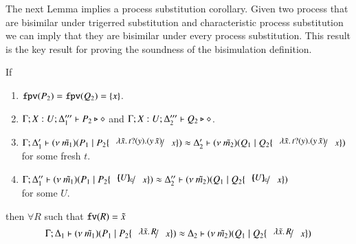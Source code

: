 
The next Lemma implies a process substitution corollary.
Given two process that are bisimilar under trigerred substitution
and characteristic process substitution we can imply that they are
bisimilar under every process substitution. This result is
the key result for proving the soundness of the bisimulation
definition.

\begin{lemma}\rm
	\label{lem:subst_equiv}
	If 
%
	\begin{enumerate}
		\item	$\mathtt{fpv}(P_2) = \mathtt{fpv}(Q_2) = \{x\}$.
		\item	$\Gamma; X: U; \Delta_1''' \vdash P_2 \triangleright \diamond$ and $\Gamma; X: U; \Delta_2''' \vdash Q_2 \triangleright \diamond$.
		\item	$\horel{\Gamma}{\Delta_1'}{\newsp{\tilde{m_1}}{P_1 \Par P_2 \subst{\abs{\tilde{x}}{\binp{t}{y} (\appl{y}{\tilde{x}})}}{x}}}
			{\wb}
			{\Delta_2'}{\newsp{\tilde{m_2}}{Q_1 \Par Q_2 \subst{\abs{\tilde{x}}{\binp{t}{y} (\appl{y}{\tilde{x}})}}{x}}}$ \\
			for some fresh $t$.

		\item	$\horel{\Gamma}{\Delta_1''}{\newsp{\tilde{m_1}}{P_1 \Par P_2 \subst{\omapchar{U}}{x}}}
			{\wb}{\Delta_2''}{\newsp{\tilde{m_2}}{Q_1 \Par Q_2 \subst{\omapchar{U}}{x}}}$\\
			for some $U$.
	\end{enumerate}
%
	then $\forall R$ such that $\mathtt{fv}(R) = \tilde{x}$
\[
	\horel{\Gamma}{\Delta_1}{\newsp{\tilde{m_1}}{P_1 \Par P_2 \subst{\abs{\tilde{x}}{R}}{x}}}
	{\wb}
	{\Delta_2}{\newsp{\tilde{m_2}}{Q_1 \Par Q_2 \subst{\abs{\tilde{x}}{R}}{x}}}
\]
\end{lemma}

